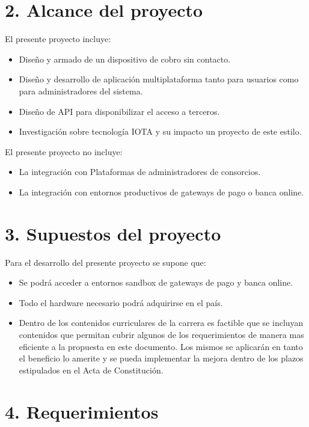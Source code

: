 \documentclass[11pt]{charter}
\begin{document}
  

\section{2. Alcance del proyecto}
\label{sec:alcance}

El presente proyecto incluye: 
\begin{itemize}
		\item Diseño y armado de un dispositivo de cobro sin contacto.  
		\item Diseño y desarrollo de aplicación multiplataforma tanto para usuarios como para administradores del sistema. 
		\item Diseño de API para disponibilizar el acceso a terceros.
		\item Investigación sobre tecnología IOTA y su impacto un proyecto de este estilo.
\end{itemize}		
 El presente proyecto no incluye:
\begin{itemize}	
		\item La integración con Plataformas de administradores de consorcios.
		\item La integración con entornos productivos de gateways de pago o banca online. 		
\end{itemize}		 
\section{3. Supuestos del proyecto}
\label{sec:supuestos}
Para el desarrollo del presente proyecto se supone que:
\begin{itemize}
\item Se podrá acceder a entornos sandbox de gateways de pago y banca online.
\item Todo el hardware necesario podrá adquirirse en el país.
\item Dentro de los contenidos curriculares de la carrera es factible que se incluyan contenidos que permitan cubrir algunos de los requerimientos de manera mas eficiente a la propuesta en este documento. Los mismos se aplicarán en tanto el beneficio lo amerite y se pueda implementar la  mejora dentro de los plazos estipulados en el Acta de Constitución.
\end{itemize}

\section{4. Requerimientos}
\label{sec:requerimientos}
\end{document}
